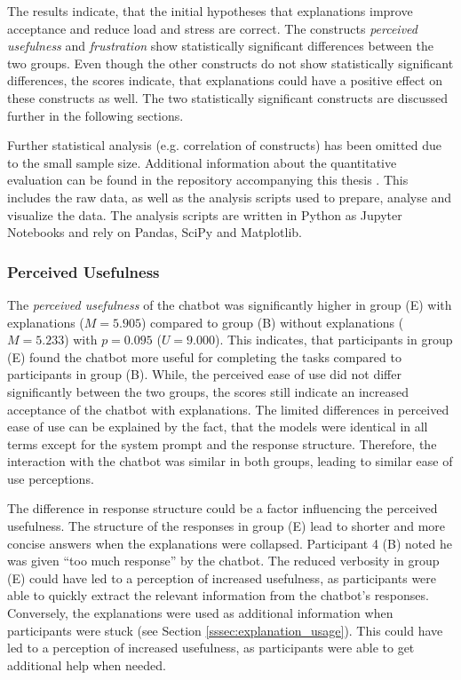 The results indicate, that the initial hypotheses that explanations improve acceptance and reduce load and stress are correct. The constructs \textit{perceived usefulness} and \textit{frustration} show statistically significant differences between the two groups. Even though the other constructs do not show statistically significant differences, the scores indicate, that explanations could have a positive effect on these constructs as well. The two statistically significant constructs are discussed further in the following sections.

Further statistical analysis (e.g. correlation of constructs) has been omitted due to the small sample size. Additional information about the quantitative evaluation can be found in the repository accompanying this thesis \parencite{Goepfert2025}. This includes the raw data, as well as the analysis scripts used to prepare, analyse and visualize the data. The analysis scripts are written in Python as Jupyter Notebooks and rely on Pandas, SciPy and Matplotlib.

\subsubsection{Perceived Usefulness} \label{sssec:model_acceptance}

The \textit{perceived usefulness} of the chatbot was significantly higher in group (E) with explanations ($M=5.905$) compared to group (B) without explanations ($M=5.233$) with $p=0.095$ ($U=9.000$). This indicates, that participants in group (E) found the chatbot more useful for completing the tasks compared to participants in group (B). While, the perceived ease of use did not differ significantly between the two groups, the scores still indicate an increased acceptance of the chatbot with explanations. The limited differences in perceived ease of use can be explained by the fact, that the models were identical in all terms except for the system prompt and the response structure. Therefore, the interaction with the chatbot was similar in both groups, leading to similar ease of use perceptions.

The difference in response structure could be a factor influencing the perceived usefulness. The structure of the responses in group (E) lead to shorter and more concise answers when the explanations were collapsed. Participant 4 (B) noted he was given “too much response” by the chatbot. The reduced verbosity in group (E) could have led to a perception of increased usefulness, as participants were able to quickly extract the relevant information from the chatbot's responses. Conversely, the explanations were used as additional information when participants were stuck (see Section \ref{sssec:explanation_usage}). This could have led to a perception of increased usefulness, as participants were able to get additional help when needed.


